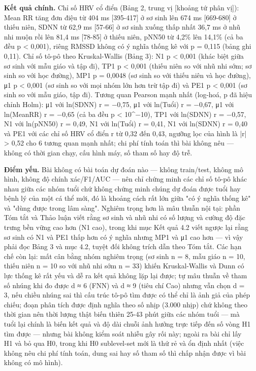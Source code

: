 \documentclass[12pt,a4paper]{article}
\begin{document}
\noindent \textbf{Kết quả chính.} Chỉ số HRV cổ điển (Bảng 2, trung vị [khoảng tứ phân vị]): Mean RR tăng đơn điệu từ 404 ms [395-417] ở sơ sinh lên 674 ms [669-680] ở thiếu niên, SDNN từ 62,9 ms [57-66] ở sơ sinh xuống thấp nhất 36,7 ms ở nhũ nhi muộn rồi lên 81,4 ms [78-85] ở thiếu niên, pNN50 từ 4,2\% lên 14,1\% (cả ba đều p < 0,001), riêng RMSSD không có ý nghĩa thống kê với p = 0,115 (bảng ghi 0,11). Chỉ số tô-pô theo Kruskal-Wallis (Bảng 3): N1 p < 0,001 (khác biệt giữa sơ sinh với mẫu giáo và tập đi), TP1 p < 0,001 (thiếu niên so với nhũ nhi sớm; sơ sinh so với học đường), MP1 p = 0,0048 (sơ sinh so với thiếu niên và học đường), μ1 p < 0,001 (sơ sinh so với mọi nhóm lớn hơn trừ tập đi) và PE1 p < 0,001 (sơ sinh so với mẫu giáo, tập đi). Tương quan Pearson mạnh nhất (log-hoá, p đã hiệu chỉnh Holm): μ1 với ln(SDNN) r = −0,75, μ1 với ln(Tuổi) r = −0,67, μ1 với ln(MeanRR) r = −0,65 (cả ba đều p < 10\textasciicircum{}−10), TP1 với ln(SDNN) r = −0,57, N1 với ln(pNN50) r = 0,49, N1 với ln(Tuổi) r = 0,41, N1 với ln(SDNN) r = 0,40 và PE1 với các chỉ số HRV cổ điển r từ 0,32 đến 0,43, ngưỡng lọc của hình là |r| > 0,52 cho 6 tương quan mạnh nhất; chi phí tính toán thì bài không nêu — không có thời gian chạy, cấu hình máy, số tham số hay độ trễ.\par\vspace{3pt}
\noindent \textbf{Điểm yếu.} Bài không có bài toán dự đoán nào — không train/test, không mô hình, không độ chính xác/F1/AUC — nên chỉ chứng minh các chỉ số tô-pô khác nhau giữa các nhóm tuổi chứ không chứng minh chúng dự đoán được tuổi hay bệnh lý của một cá thể mới, đó là khoảng cách rất lớn giữa "có ý nghĩa thống kê" và "dùng được trong lâm sàng". Nghiêm trọng hơn là mâu thuẫn nội tại: phần Tóm tắt và Thảo luận viết rằng sơ sinh và nhũ nhi có số lượng và cường độ đặc trưng bền vững cao hơn (N1 cao), trong khi mục Kết quả 4.2 viết ngược lại rằng sơ sinh có N1 và PE1 thấp hơn có ý nghĩa nhưng MP1 và μ1 cao hơn — vì vậy phải đọc Bảng 3 và mục 4.2, tuyệt đối không trích dẫn theo Tóm tắt. Các hạn chế còn lại: mất cân bằng nhóm nghiêm trọng (sơ sinh n = 8, mẫu giáo n = 10, thiếu niên n = 10 so với nhũ nhi sớm n = 33) khiến Kruskal-Wallis và Dunn có lực thống kê rất yếu và dễ ra kết quả không lặp lại được; tự mâu thuẫn về tham số nhúng khi đo được d ≈ 6 (FNN) và d ≈ 9 (tiêu chí Cao) nhưng vẫn chọn d = 3, nếu chiều nhúng sai thì cấu trúc tô-pô tìm được có thể chỉ là ảnh giả của phép chiếu; đoạn phân tích được định nghĩa theo số nhịp (3.000 nhịp) chứ không theo thời gian nên thời lượng thật biến thiên 25-43 phút giữa các nhóm tuổi — mà tuổi lại chính là biến kết quả và độ dài chuỗi ảnh hưởng trực tiếp đến số vòng H1 tìm được — nhưng bài không kiểm soát nhiễu gây rối này; ngoài ra bài chỉ lấy H1 và bỏ qua H0, trong khi H0 sublevel-set mới là thứ rẻ và ổn định nhất (việc không nêu chi phí tính toán, dung sai hay số tham số thì chấp nhận được vì bài không có mô hình).\par\vspace{3pt}
\end{document}
